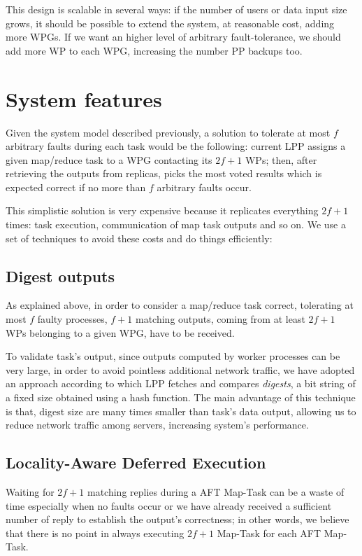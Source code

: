\documentclass[sigchi]{acmart}
\begin{document}
This design is scalable in several ways: if the number of users or data input size grows, it should be possible to extend the system, at reasonable cost, adding more WPGs. If we want an higher level of arbitrary fault-tolerance, we should add more WP to each WPG, increasing the number PP backups too.

\section{System features}

Given the system model described previously, a solution to tolerate at most $f$ arbitrary faults during each task would be the following: current LPP assigns a given map/reduce task to a WPG contacting its $2f + 1$ WPs; then, after retrieving the outputs from replicas, picks the most voted results which is expected correct if no more than $f$ arbitrary faults occur. 

This simplistic solution is very expensive because it replicates everything $2f + 1$ times: task execution, communication of map task outputs and so on. We use a set of techniques to avoid these costs and do things efficiently:

\subsection{Digest outputs} As explained above, in order to consider a map/reduce task correct, tolerating at most $f$ faulty processes, $f + 1$ matching outputs, coming from at least $2f + 1$ WPs belonging to a given WPG,  have to be received. 

To validate task's output, since outputs computed by worker processes can be very large, in order to avoid pointless additional network traffic, we have adopted an approach according to which LPP fetches and compares \textit{digests}, a bit string of a fixed size obtained using a hash function. The main advantage of this technique is that, digest size are many times smaller than task's data output, allowing us to reduce network traffic among servers, increasing system's performance.

\subsection{Locality-Aware Deferred Execution} 

Waiting for $2f + 1$ matching replies during a AFT Map-Task can be a waste of time especially when no faults occur or we have already received a sufficient number of reply to establish the output's correctness; in other words, we believe that there is no point in always executing $2f + 1$ Map-Task for each AFT Map-Task.
\end{document}
